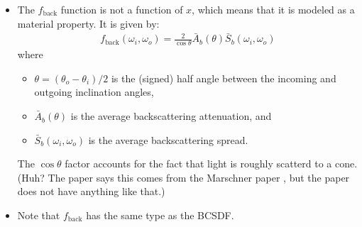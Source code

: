 \documentclass[10pt]{article}
\begin{document}
\begin{itemize}
    \item The $f_{\mathrm{back}}$ function is not a function of $x$, which means that it is modeled as a material property.  It is given by:
    \begin{align*}
      f_{\mathrm{back}}(\omega_i, \omega_o) = \frac{2}{\cos \theta}  \bar{A}_b(\theta) \bar{S}_b(\omega_i,\omega_o)
    \end{align*}
    where
    \begin{itemize}
      \item $\theta = (\theta_o - \theta_i)/2$ is the (signed) half angle between the incoming and outgoing inclination angles,
      \item $\bar{A}_b(\theta)$ is the average backscattering attenuation, and
      \item $\bar{S}_b(\omega_i, \omega_o)$ is the average backscattering spread.
    \end{itemize}
    The $\cos\theta$ factor accounts for the fact that light is roughly scatterd to a cone. (Huh?  The paper says this comes from the Marschner paper \cite{Marschner:2003}, but the paper does not have anything like that.)

    \item Note that $f_{\mathrm{back}}$ has the same type as the BCSDF.


\end{itemize}
\end{document}
